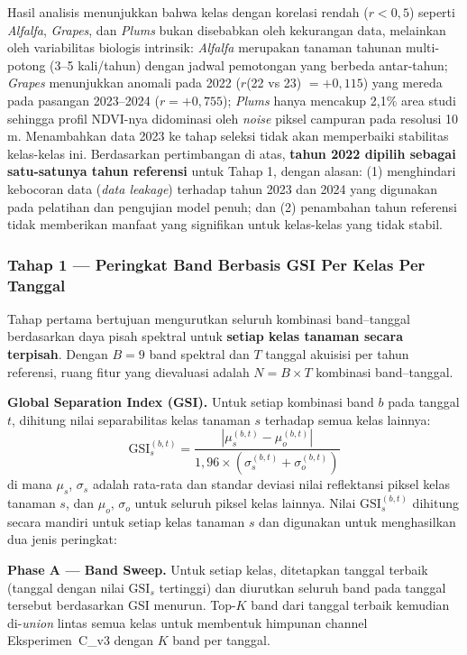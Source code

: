 Hasil analisis menunjukkan bahwa kelas dengan korelasi rendah ($r < 0{,}5$) seperti \textit{Alfalfa}, \textit{Grapes}, dan \textit{Plums} bukan disebabkan oleh kekurangan data, melainkan oleh variabilitas biologis intrinsik:
\textit{Alfalfa} merupakan tanaman tahunan multi-potong (3--5 kali/tahun) dengan jadwal pemotongan yang berbeda antar-tahun;
\textit{Grapes} menunjukkan anomali pada 2022 ($r$(22 vs 23) $= +0{,}115$) yang mereda pada pasangan 2023--2024 ($r = +0{,}755$);
\textit{Plums} hanya mencakup 2{,}1\% area studi sehingga profil NDVI-nya didominasi oleh \textit{noise} piksel campuran pada resolusi 10 m.
Menambahkan data 2023 ke tahap seleksi tidak akan memperbaiki stabilitas kelas-kelas ini.
Berdasarkan pertimbangan di atas, \textbf{tahun 2022 dipilih sebagai satu-satunya tahun referensi} untuk Tahap 1, dengan alasan: (1) menghindari kebocoran data (\textit{data leakage}) terhadap tahun 2023 dan 2024 yang digunakan pada pelatihan dan pengujian model penuh; dan (2) penambahan tahun referensi tidak memberikan manfaat yang signifikan untuk kelas-kelas yang tidak stabil.

\subsubsection{Tahap 1 — Peringkat Band Berbasis GSI Per Kelas Per Tanggal}
\label{subsubsec:stage1}

Tahap pertama bertujuan mengurutkan seluruh kombinasi band--tanggal berdasarkan daya pisah spektral untuk \textbf{setiap kelas tanaman secara terpisah}.
Dengan $B = 9$ band spektral dan $T$ tanggal akuisisi per tahun referensi, ruang fitur yang dievaluasi adalah $N = B \times T$ kombinasi band--tanggal.

\textbf{Global Separation Index (GSI).}
Untuk setiap kombinasi band $b$ pada tanggal $t$, dihitung nilai separabilitas kelas tanaman $s$ terhadap semua kelas lainnya:
\begin{equation}
    \text{GSI}_{s}^{(b,t)} = \frac{|\mu_s^{(b,t)} - \mu_o^{(b,t)}|}{1{,}96 \times (\sigma_s^{(b,t)} + \sigma_o^{(b,t)})}
\end{equation}
di mana $\mu_s$, $\sigma_s$ adalah rata-rata dan standar deviasi nilai reflektansi piksel kelas tanaman $s$, dan $\mu_o$, $\sigma_o$ untuk seluruh piksel kelas lainnya. Nilai $\text{GSI}_{s}^{(b,t)}$ dihitung secara mandiri untuk setiap kelas tanaman $s$ dan digunakan untuk menghasilkan dua jenis peringkat:

\textbf{Phase A — Band Sweep.}
Untuk setiap kelas, ditetapkan tanggal terbaik (tanggal dengan nilai $\text{GSI}_{s}$ tertinggi) dan diurutkan seluruh band pada tanggal tersebut berdasarkan GSI menurun.
Top-$K$ band dari tanggal terbaik kemudian di-\textit{union} lintas semua kelas untuk membentuk himpunan channel Eksperimen~C\_v3 dengan $K$ band per tanggal.

